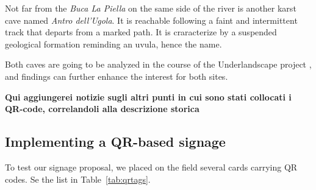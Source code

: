 \documentclass[sustainability,article,submit,pdftex,moreauthors]{Definitions/mdpi}
\begin{document}
Not far from the {\em Buca La Piella} on the same side of the river is another karst cave named {\em Antro dell'Ugola}. It is reachable following a faint and intermittent track that departs from a marked path. It is craracterize by a suspended geological formation reminding an uvula, hence the name.

Both caves are going to be analyzed in the course of the Underlandscape project \cite{Underlandscape}, and findings can further enhance the interest for both sites.

\textbf{Qui aggiungerei notizie sugli altri punti in cui sono stati collocati i QR-code, correlandoli alla descrizione storica
}


\subsection{Implementing a QR-based signage}

To test our signage proposal, we placed on the field several cards carrying QR codes. Se the list in Table~\ref{tab:qrtags}.
\end{document}
